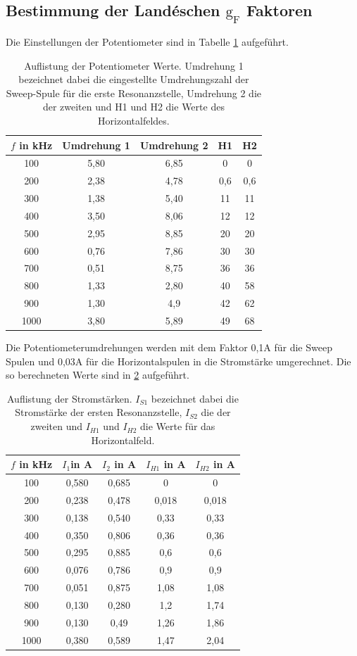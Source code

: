 \subsection{Bestimmung der Landéschen $\text{g}_{\text{F}}$ Faktoren}
Die Einstellungen der Potentiometer sind in Tabelle \ref{tab:Potentiometer} aufgeführt.
\begin{table}[H]
    \centering
    \caption{Auflistung der Potentiometer Werte. Umdrehung 1 bezeichnet dabei die eingestellte Umdrehungszahl der Sweep-Spule für die
    erste Resonanzstelle, Umdrehung 2 die der zweiten und H1 und H2 die Werte des Horizontalfeldes.}
    \label{tab:Potentiometer}
    \begin{tabular}{c|c|c|c|c}
        \toprule
        $f$ in kHz & Umdrehung 1 & Umdrehung 2 & H1 & H2  \\
        \midrule
        100& 5,80 &6,85& 0 & 0 \\
        200& 2,38 &4,78& 0,6& 0,6\\
        300& 1,38 &5,40& 11 &11\\
        400& 3,50 &8,06& 12 &12\\
        500& 2,95 &8,85& 20 &20\\
        600& 0,76 &7,86& 30 &30\\
        700& 0,51 &8,75& 36 &36\\
        800& 1,33 &2,80& 40 &58\\
        900& 1,30  &4,9 &42 &62\\
        1000& 3,80 &5,89& 49& 68\\
        \bottomrule
    \end{tabular}
\end{table}
Die Potentiometerumdrehungen werden mit dem Faktor 0,1A für die Sweep Spulen und
0,03A für die Horizontalspulen in die Stromstärke umgerechnet. Die so berechneten Werte sind in
\ref{tab:Umrechnung} aufgeführt.
\begin{table}[H]
    \centering
    \caption{Auflistung der Stromstärken. $I_{S1}$ bezeichnet dabei die Stromstärke der
    ersten Resonanzstelle, $I_{S2}$ die der zweiten und $I_{H1}$ und $I_{H2}$ die Werte für das Horizontalfeld.}
    \label{tab:Umrechnung}
    \begin{tabular}{c|c|c|c|c}
        \toprule
        $f$ in kHz & $I_1$in A & $I_2$ in A & $I_{H1}$ in A  & $I_{H2}$ in A   \\
        \midrule
        100& 0,580 &0,685& 0 & 0 \\
        200& 0,238 &0,478& 0,018& 0,018\\
        300& 0,138 &0,540& 0,33 &0,33\\
        400& 0,350 &0,806& 0,36 &0,36\\
        500& 0,295 &0,885& 0,6 &0,6\\
        600& 0,076 &0,786& 0,9 &0,9\\
        700& 0,051 &0,875& 1,08 &1,08\\
        800& 0,130 &0,280& 1,2 &1,74\\
        900& 0,130  &0,49 &1,26 &1,86\\
        1000& 0,380 &0,589& 1,47& 2,04\\
        \bottomrule
    \end{tabular}
\end{table}

